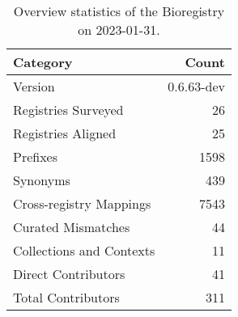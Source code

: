 \begin{table}
\centering
\caption{Overview statistics of the Bioregistry on 2023-01-31.}
\label{tab:bioregistry-summary}
\begin{tabular}{lr}
\toprule
                Category &      Count \\
\midrule
                 Version & 0.6.63-dev \\
     Registries Surveyed &         26 \\
      Registries Aligned &         25 \\
                Prefixes &       1598 \\
                Synonyms &        439 \\
 Cross-registry Mappings &       7543 \\
      Curated Mismatches &         44 \\
Collections and Contexts &         11 \\
     Direct Contributors &         41 \\
      Total Contributors &        311 \\
\bottomrule
\end{tabular}
\end{table}
